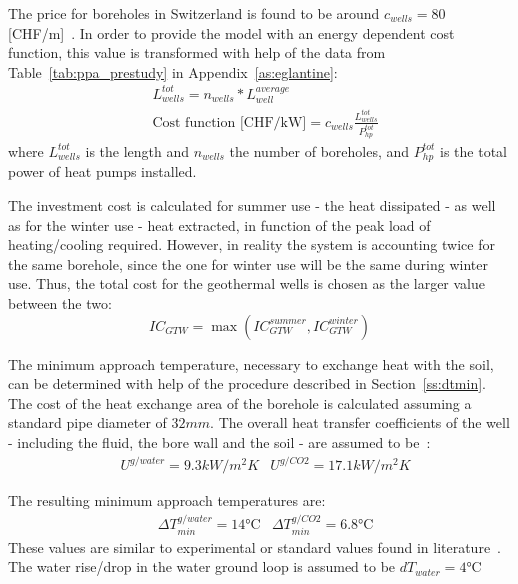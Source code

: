 \documentclass{article}
\begin{document}
The price for boreholes in Switzerland is found to be around $c_{wells} = 80$ [CHF/m]~\cite{bawos.chMitErdsondenbohrungenKosten2018}. 
In order to provide the model with an energy dependent cost function, this value is transformed with help of the data from Table~\ref{tab:ppa_prestudy} in Appendix~\ref{as:eglantine}:
\begin{align}
&  L_{wells}^{tot} = n_{wells} * L_{well}^{average} \\
& 	\text{Cost function [CHF/kW]} = c_{wells} \frac{L_{wells}^{tot}}{P_{hp}^{tot}}
\end{align}
where $L_{wells}^{tot}$ is the length and $n_{wells}$ the number of boreholes, and $P_{hp}^{tot}$ is the total power of heat pumps installed. 

The investment cost is calculated for summer use - the heat dissipated - as well as for the winter use - heat extracted, in function of the peak load of heating/cooling required. However, in reality the system is accounting twice for the same borehole, since the one for winter use will be the same during winter use. Thus, the total cost for the geothermal wells is chosen as the larger value between the two:
\begin{equation}
IC_{GTW} = 	\max \left( IC_{GTW}^{summer}, IC_{GTW}^{winter} \right) 
\end{equation}

The minimum approach temperature, necessary to exchange heat with the soil, can be determined with help of the procedure described in Section~\ref{ss:dtmin}. 
The cost of the heat exchange area of the borehole is calculated assuming a standard pipe diameter of $32 mm$\cite{siaSIA384Sondes2010, kruseStatusDevelopmentResearch2010}.
The overall heat transfer coefficients of the well - including the fluid, the bore wall and the soil - are assumed to be~\cite{kruseStatusDevelopmentResearch2010}:
\begin{align}
	& U^{g/water} = 9.3 kW/m^2K
	& U^{g/CO2} = 17.1 kW/m^2K
\end{align}

The resulting minimum approach temperatures are:
\begin{align}
	&\Delta T_{min}^{g/water} = 14 \si{\celsius}
	&\Delta T_{min}^{g/CO2} = 6.8 \si{\celsius}
\end{align}
These values are similar to experimental or standard values found in literature~\cite{siaSIA384Sondes2010, lamarcheReviewMethodsEvaluate2010}.\\

The water rise/drop in the water ground loop is assumed to be $dT_{water} = 4 \si{\celsius}$~\cite{siaSIA384Sondes2010}\\
\end{document}
